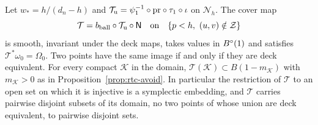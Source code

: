 \begin{theorem}\label{thm:rtc-transfer}\label{thm:cub-transfer}
Let $w_*=h/(d_n-h)$ and $\mathcal T_{\rm u}=\psi_1^{-1}\circ\mathrm{pr}\circ\tau_1\circ\iota$ on $\mathcal N_h$. The cover map
\[
 \mathcal T=b_{\rm ball}\circ\mathcal T_{\rm u}\circ\mathsf N
 \quad\text{on}\quad\{p<h,\ (u,v)\notin\mathcal Z\}
\]
is smooth, invariant under the deck maps, takes values in $B^{\circ}(1)$ and satisfies $\mathcal T^*\omega_0=\Omega_0$. Two points
have the same image if and only if they are deck equivalent. For every compact $\mathcal K$ in the domain,
$\mathcal T(\mathcal K)\subset B(1-m_{\mathcal K})$ with $m_{\mathcal K}>0$ as in Proposition~\ref{prop:rtc-avoid}. In particular the
restriction of $\mathcal T$ to an open set on which it is injective is a symplectic embedding, and $\mathcal T$ carries
pairwise disjoint subsets of its domain, no two points of whose union are deck equivalent, to pairwise disjoint sets.
\end{theorem}
